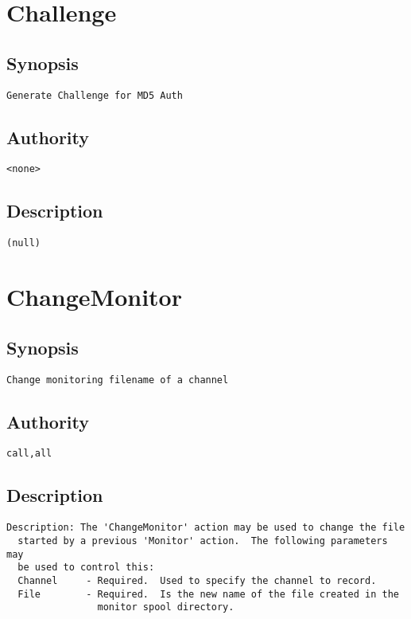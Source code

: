 \section{Challenge}
\subsection{Synopsis}
\begin{verbatim}
Generate Challenge for MD5 Auth
\end{verbatim}
\subsection{Authority}
\begin{verbatim}
<none>
\end{verbatim}
\subsection{Description}
\begin{verbatim}
(null)
\end{verbatim}


\section{ChangeMonitor}
\subsection{Synopsis}
\begin{verbatim}
Change monitoring filename of a channel
\end{verbatim}
\subsection{Authority}
\begin{verbatim}
call,all
\end{verbatim}
\subsection{Description}
\begin{verbatim}
Description: The 'ChangeMonitor' action may be used to change the file
  started by a previous 'Monitor' action.  The following parameters may
  be used to control this:
  Channel     - Required.  Used to specify the channel to record.
  File        - Required.  Is the new name of the file created in the
                monitor spool directory.

\end{verbatim}



